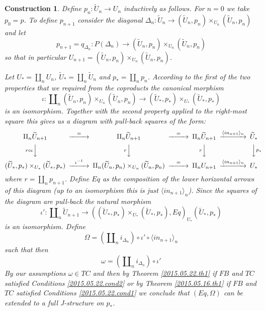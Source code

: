 \documentclass[12pt]{article}
\newtheorem{construction}[proposition]{Construction}
\newcommand{\llabel}[1]{\label{#1}}
\newcommand{\sr}{\rightarrow}
\newcommand{\wt}{\widetilde}
\begin{document}
%
\begin{construction}\rm\llabel{2015.05.23.constr1}
Define $p_n:\wt{U}_n\sr U_n$ inductively as follows. For $n=0$ we take $p_0=p$. To define $p_{n+1}$ consider the diagonal $\Delta_n:\wt{U}_n\sr (\wt{U}_n,p_n)\times_{U_n}(\wt{U}_n,p_n)$ and let 
%
$$p_{n+1}=q_{\Delta_n}:P(\Delta_n)\sr (\wt{U}_n,p_n)\times_{U_n}(\wt{U}_n,p_n)$$
%
so that in particular $U_{n+1}=(\wt{U}_n,p_n)\times_{U_n}(\wt{U}_n,p_n)$. 

Let $U_*=\amalg_n U_n$, $\wt{U}_*=\amalg_n\wt{U}_n$ and $p_*=\amalg_n p_n$. According to the first of the two properties that we required from the coproducts the canonical morphism 
%
$$\iota:\amalg_n (\wt{U}_n,p_n)\times_{U_n}(\wt{U}_n,p_n)\sr (\wt{U}_*,p_*)\times_{U_*}(\wt{U}_*,p_*)$$
%
is an isomorphism. Together with the second property applied to the right-most square this gives us a diagram with pull-back squares of the form:
%
$$
\begin{CD}
\amalg_n\wt{U}_{n+1} @>=>> \amalg_n\wt{U}_{n+1} @>=>> \amalg_n\wt{U}_{n+1} @> \langle in_{n+1} \rangle_{n} >> \wt{U}_*\\
@V r\circ \iota VV @V r VV @V r VV @VV p_* V\\
(\wt{U}_*,p_*)\times_{U_*}(\wt{U}_*,p_*) @>\iota^{-1}>> \amalg_n (\wt{U}_n,p_n)\times_{U_n}(\wt{U}_n,p_n) @>=>> \amalg_n U_{n+1} @> \langle in_{n+1} \rangle_{n} >> U_*
\end{CD}
$$
%
where $r=\amalg_n p_{n+1}$. Define $Eq$ as the composition of the lower horizontal arrows of this diagram (up to an isomorphism this is just $\langle in_{n+1}\rangle_{n}$). Since the squares of the diagram are pull-back the natural morphism
%
$$\iota':\amalg_n\wt{U}_{n+1}\sr ((\wt{U}_*,p_*)\times_{U_*}(\wt{U}_*,p_*),Eq)_{U_*} (\wt{U}_*,p_*)$$
%
is an isomorphism. Define
%
$$\Omega=(\amalg_n i_{\Delta_n})\circ \iota'\circ \langle in_{n+1} \rangle_{n}$$
%
such that then 
%
$$\omega=(\amalg_n i_{\Delta_n})\circ \iota'$$
%
By our assumptions $\omega\in TC$ and then by Theorem \ref{2015.05.22.th1} if $FB$ and $TC$ satisfied Conditions \ref{2015.05.22.cond2} or by Theorem \ref{2015.05.16.th1} if $FB$ and $TC$ satisfied Conditions \ref{2015.05.22.cond1} we conclude that $(Eq,\Omega)$ can be extended to a full J-structure on $p_*$.
\end{construction}
%
\end{document}
